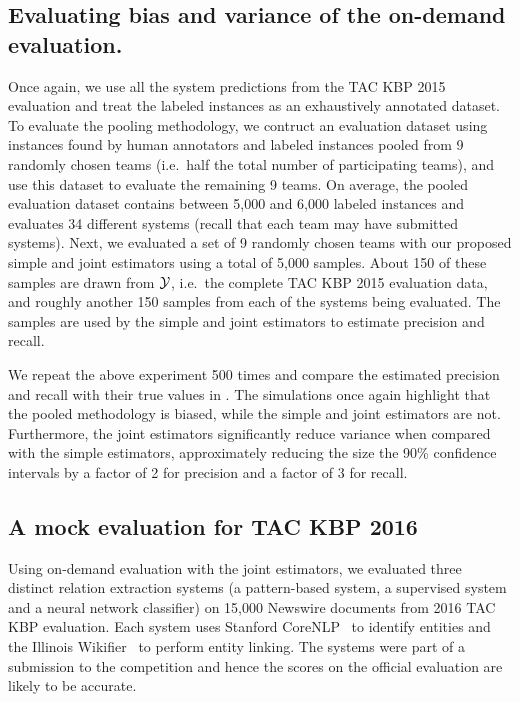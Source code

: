 \subsection{Evaluating bias and variance of the on-demand evaluation.}
Once again, we use all the system predictions from the TAC KBP 2015 evaluation and treat the labeled instances as an exhaustively annotated dataset.
To evaluate the pooling methodology, we contruct an evaluation dataset using
instances found by human annotators and labeled instances pooled from 9
randomly chosen teams (i.e.\ half the total number of participating teams), and
use this dataset to evaluate the remaining 9 teams.
On average, the pooled evaluation dataset contains between 5,000 and 6,000 labeled instances and evaluates 34 different systems (recall that each team may have submitted systems).
Next, we evaluated a set of 9 randomly chosen teams with our proposed simple and joint estimators using a total of 5,000 samples.
About 150 of these samples are drawn from $\mathcal{Y}$, i.e.\ the complete TAC KBP 2015 evaluation data, and roughly another 150 samples from each of the systems being evaluated.
The samples are used by the simple and joint estimators to estimate precision and recall.

We repeat the above experiment 500 times and compare the estimated precision and recall with their true values in .
The simulations once again highlight that the pooled methodology is biased, while the simple and joint estimators are not.
Furthermore, the joint estimators significantly reduce variance when compared with the simple estimators,
approximately reducing the size the 90\% confidence intervals by a factor of 2 for precision and a factor of 3 for recall.

\subsection{A mock evaluation for TAC KBP 2016}
Using on-demand evaluation with the joint estimators, we evaluated three distinct relation extraction systems (a pattern-based system, a supervised system and a neural network classifier) on 15,000 Newswire documents from 2016 TAC KBP evaluation.
Each system uses Stanford CoreNLP~\citep{XXX} to identify entities and the Illinois Wikifier~\citep{XXX} to perform entity linking. 
The systems were part of a submission to the competition and hence the scores on the official evaluation are likely to be accurate.

